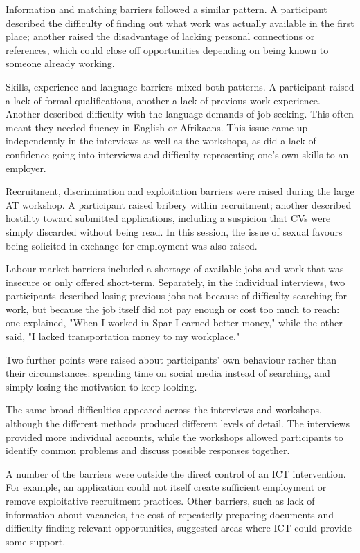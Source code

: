 Information and matching barriers followed a similar pattern. A participant described the difficulty of finding out what work was actually available in the first place; another raised the disadvantage of lacking personal connections or references, which could close off opportunities depending on being known to someone already working.

Skills, experience and language barriers mixed both patterns. A participant raised a lack of formal qualifications, another a lack of previous work experience. Another described difficulty with the language demands of job seeking. This often meant they needed fluency in English or Afrikaans. This issue came up independently in the interviews as well as the workshops, as did a lack of confidence going into interviews and difficulty representing one's own skills to an employer.

Recruitment, discrimination and exploitation barriers were raised during the large AT workshop. A participant raised bribery within recruitment; another described hostility toward submitted applications, including a suspicion that CVs were simply discarded without being read. In this session, the issue of sexual favours being solicited in exchange for employment was also raised.

Labour-market barriers included a shortage of available jobs and work that was insecure or only offered short-term. Separately, in the individual interviews, two participants described losing previous jobs not because of difficulty searching for work, but because the job itself did not pay enough or cost too much to reach: one explained, "When I worked in Spar I earned better money," while the other said, "I lacked transportation money to my workplace."

Two further points were raised about participants' own behaviour rather than their circumstances: spending time on social media instead of searching, and simply losing the motivation to keep looking.

The same broad difficulties appeared across the interviews and workshops, although the different methods produced different levels of detail. The interviews provided more individual accounts, while the workshops allowed participants to identify common problems and discuss possible responses together.

A number of the barriers were outside the direct control of an ICT intervention. For example, an application could not itself create sufficient employment or remove exploitative recruitment practices. Other barriers, such as lack of information about vacancies, the cost of repeatedly preparing documents and difficulty finding relevant opportunities, suggested areas where ICT could provide some support.


